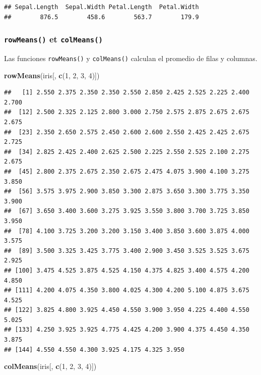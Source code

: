 \documentclass[]{book}
\newenvironment{Shaded}{\begin{snugshade}}{\end{snugshade}}
\newcommand{\KeywordTok}[1]{\textcolor[rgb]{0.13,0.29,0.53}{\textbf{#1}}}
\newcommand{\DecValTok}[1]{\textcolor[rgb]{0.00,0.00,0.81}{#1}}
\newcommand{\NormalTok}[1]{#1}
\begin{document}
\begin{verbatim}
## Sepal.Length  Sepal.Width Petal.Length  Petal.Width 
##        876.5        458.6        563.7        179.9
\end{verbatim}

\subsubsection{\texorpdfstring{\texttt{rowMeans()} et
\texttt{colMeans()}}{rowMeans() et colMeans()}}\label{l015rowmeans}

Las funciones \texttt{rowMeans()} y \texttt{colMeans()} calculan el
promedio de filas y columnas.

\begin{Shaded}
\begin{Highlighting}[]
\KeywordTok{rowMeans}\NormalTok{(iris[, }\KeywordTok{c}\NormalTok{(}\DecValTok{1}\NormalTok{, }\DecValTok{2}\NormalTok{, }\DecValTok{3}\NormalTok{, }\DecValTok{4}\NormalTok{)])}
\end{Highlighting}
\end{Shaded}

\begin{verbatim}
##   [1] 2.550 2.375 2.350 2.350 2.550 2.850 2.425 2.525 2.225 2.400 2.700
##  [12] 2.500 2.325 2.125 2.800 3.000 2.750 2.575 2.875 2.675 2.675 2.675
##  [23] 2.350 2.650 2.575 2.450 2.600 2.600 2.550 2.425 2.425 2.675 2.725
##  [34] 2.825 2.425 2.400 2.625 2.500 2.225 2.550 2.525 2.100 2.275 2.675
##  [45] 2.800 2.375 2.675 2.350 2.675 2.475 4.075 3.900 4.100 3.275 3.850
##  [56] 3.575 3.975 2.900 3.850 3.300 2.875 3.650 3.300 3.775 3.350 3.900
##  [67] 3.650 3.400 3.600 3.275 3.925 3.550 3.800 3.700 3.725 3.850 3.950
##  [78] 4.100 3.725 3.200 3.200 3.150 3.400 3.850 3.600 3.875 4.000 3.575
##  [89] 3.500 3.325 3.425 3.775 3.400 2.900 3.450 3.525 3.525 3.675 2.925
## [100] 3.475 4.525 3.875 4.525 4.150 4.375 4.825 3.400 4.575 4.200 4.850
## [111] 4.200 4.075 4.350 3.800 4.025 4.300 4.200 5.100 4.875 3.675 4.525
## [122] 3.825 4.800 3.925 4.450 4.550 3.900 3.950 4.225 4.400 4.550 5.025
## [133] 4.250 3.925 3.925 4.775 4.425 4.200 3.900 4.375 4.450 4.350 3.875
## [144] 4.550 4.550 4.300 3.925 4.175 4.325 3.950
\end{verbatim}

\begin{Shaded}
\begin{Highlighting}[]
\KeywordTok{colMeans}\NormalTok{(iris[, }\KeywordTok{c}\NormalTok{(}\DecValTok{1}\NormalTok{, }\DecValTok{2}\NormalTok{, }\DecValTok{3}\NormalTok{, }\DecValTok{4}\NormalTok{)])}
\end{Highlighting}
\end{Shaded}
\end{document}
